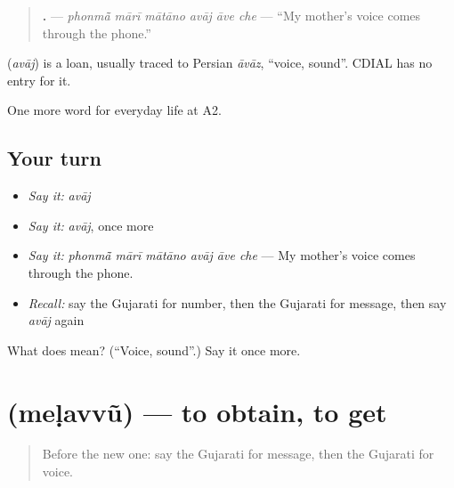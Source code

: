 \begin{quote}
\textbf{     .} — \emph{phonmā̃ mārī mātāno avāj āve che} — \textquotedblleft{}My mother's voice comes through the phone.\textquotedblright{}
\end{quote}

\begin{cousinweb}
\textbf{} (\emph{avāj}) is a loan, usually traced to Persian \emph{āvāz}, \textquotedblleft{}voice, sound\textquotedblright{}. CDIAL has no entry for it.
\end{cousinweb}

\begin{grammarlens}[title={What you've built}]
One more word for everyday life at A2.
\end{grammarlens}

\subsection*{Your turn}
\begin{itemize}
\raggedright
  \item \emph{Say it:} \emph{avāj}
  \item \emph{Say it:} \emph{avāj}, once more
  \item \emph{Say it:} \emph{phonmā̃ mārī mātāno avāj āve che} — My mother's voice comes through the phone.
  \item \emph{Recall:} say the Gujarati for number, then the Gujarati for message, then say \emph{avāj} again
\end{itemize}

\begin{tcolorbox}[breakable,colback=teal!4,colframe=teal!35!black,title={Before you move on}]
What does  mean? (\textquotedblleft{}Voice, sound\textquotedblright{}.) Say it once more.
\end{tcolorbox}
\section[\texorpdfstring{\gu{મેળવવું} (meḷavvũ)}{મેળવવું (meḷavvũ)}]{ (meḷavvũ) — to obtain, to get}

\label{lesson:GU-C249-melavvu}



\begin{quote}
Before the new one: say the Gujarati for message, then the Gujarati for voice.
\end{quote}

